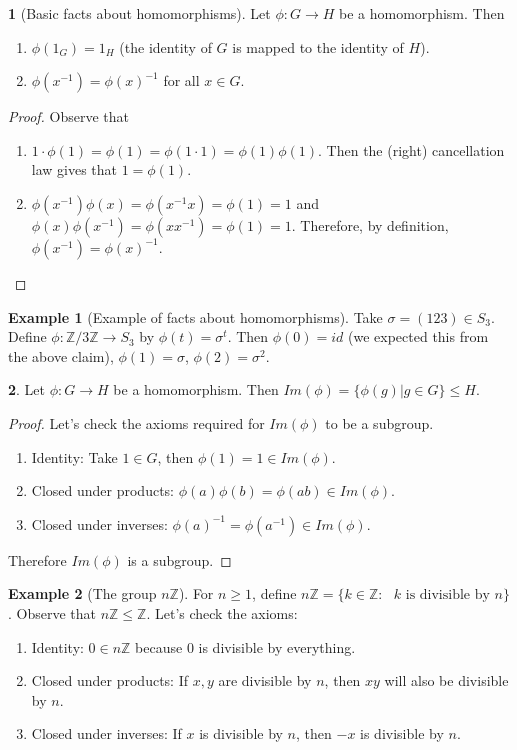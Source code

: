\documentclass[12pt]{article}
\theoremstyle{definition}
\newtheorem{theorem}{\color{ForestGreen}{\textbf{Theorem}}}
\newtheorem{example}{\color{WildStrawberry}Example}
\theoremstyle{definition}
\begin{document}
\begin{theorem}[Basic facts about homomorphisms]
Let $\phi : G \to H$ be a homomorphism. Then
\begin{enumerate}
	\item $\phi(1_G) = 1_H$ (the identity of $G$ is mapped to the identity of $H$).
	\item $\phi(x^{-1}) = \phi(x)^{-1}$ for all $x \in G$.
\end{enumerate}
\end{theorem}
\begin{proof}
Observe that
\begin{enumerate}
	\item $1 \cdot \phi(1) = \phi(1) = \phi(1 \cdot 1) = \phi(1)\phi(1)$. Then the (right) cancellation law gives that $1 = \phi(1)$.
	\item $\phi(x^{-1})\phi(x) = \phi(x^{-1}x) = \phi(1) = 1$ and $\phi(x)\phi(x^{-1}) = \phi(xx^{-1}) = \phi(1) = 1$. Therefore, by definition, $\phi(x^{-1}) = \phi(x)^{-1}$.
\end{enumerate}
\end{proof}

\begin{example}[Example of facts about homomorphisms]
Take $\sigma = (1 2 3) \in S_3$. Define $\phi : \mathbb{Z} / 3 \mathbb{Z} \to S_3$ by $\phi(t) = \sigma^t$. Then $\phi(0) = id$ (we expected this from the above claim), $\phi(1) = \sigma$, $\phi(2) = \sigma^2$. 
\end{example}

\begin{theorem}
Let $\phi : G \to H$ be a homomorphism. Then $Im(\phi) = \{ \phi(g) | g \in G \} \leq H$.
\end{theorem}
\begin{proof}
Let's check the axioms required for $Im(\phi)$ to be a subgroup.
\begin{enumerate}
	\item Identity: Take $1 \in G$, then $\phi(1) = 1 \in Im(\phi)$.
	\item Closed under products: $\phi(a)\phi(b) = \phi(ab) \in Im(\phi)$.
	\item Closed under inverses: $\phi(a)^{-1} = \phi(a^{-1}) \in Im(\phi)$.
\end{enumerate}
Therefore $Im(\phi)$ is a subgroup.
\end{proof}

\begin{example}[The group $n \mathbb{Z}$]
For $n \geq 1$, define $n \mathbb{Z} = \{ k \in \mathbb{Z} : \text{ $k$ is divisible by $n$} \}$. Observe that $n \mathbb{Z} \leq \mathbb{Z}$. Let's check the axioms:
\begin{enumerate}
	\item Identity: $0 \in n \mathbb{Z}$ because $0$ is divisible by everything. 
	\item Closed under products: If $x,y$ are divisible by $n$, then $xy$ will also be divisible by $n$.
	\item Closed under inverses: If $x$ is divisible by $n$, then $-x$ is divisible by $n$.
\end{enumerate}
\end{example}
\end{document}
